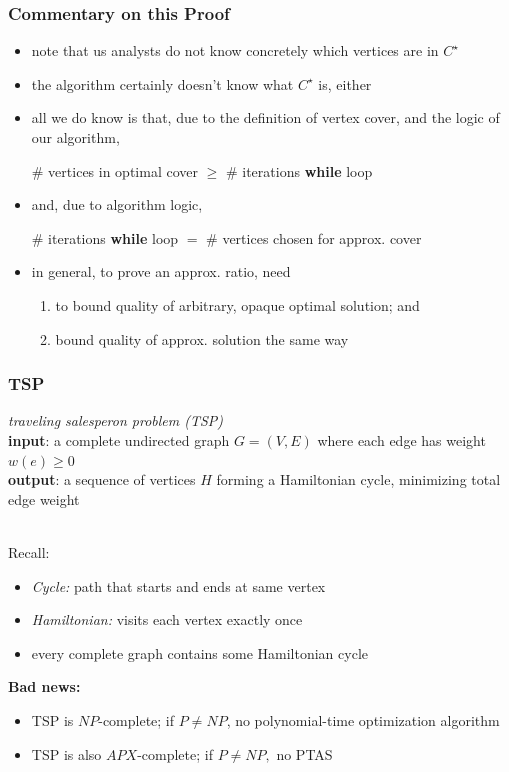 \documentclass{beamer}
\newcommand{\stanza}{ \\~\ }
\begin{document}
\begin{frame} \frametitle{Commentary on this Proof}
\begin{itemize}
  \item note that us analysts do not know concretely which vertices are in $C^\star$
  \item the algorithm certainly doesn't know what $C^\star$ is, either
  \item all we do know is that, due to the definition of vertex cover, and
    the logic of our algorithm,
    \begin{center}
      \# vertices in optimal cover $\geq$ \# iterations \textbf{while} loop
    \end{center}
  \item and, due to algorithm logic,
  \begin{center}
      \# iterations \textbf{while} loop $=$ \# vertices chosen for approx. cover
  \end{center}
  \item in general, to prove an approx. ratio, need
  \begin{enumerate}
    \item to bound quality of arbitrary, opaque optimal solution; and
    \item bound quality of approx. solution the same way
  \end{enumerate}
\end{itemize}
\end{frame}

\begin{frame} \frametitle{TSP}
\emph{traveling salesperon problem (TSP)} \\
\textbf{input}: a complete undirected graph $G=(V,E)$ where each edge has weight $w(e) \geq 0$ \\
\textbf{output}: a sequence of vertices $H$ forming a Hamiltonian cycle, minimizing
total edge weight
\stanza

Recall:
\begin{itemize}
  \item \emph{Cycle:} path that starts and ends at same vertex
  \item \emph{Hamiltonian:} visits each vertex exactly once
  \item every complete graph contains some Hamiltonian cycle
\end{itemize}

\textbf{Bad news:}
\begin{itemize}
  \item TSP is $NP$-complete; if $P \ne NP$, no polynomial-time optimization algorithm
  \item TSP is also $APX$-complete; if $P \ne NP,$ no PTAS
\end{itemize}
\end{frame}
\end{document}
